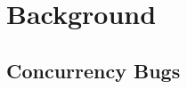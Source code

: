 \documentclass{llncs}
\begin{document}







\section{Background}
\label{sec:background}

\subsection{Concurrency Bugs}
\label{sec:concurrency}

\end{document}
